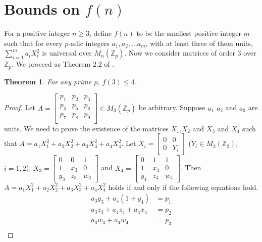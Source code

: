 \documentclass[12pt,a4paper]{article}
\newtheorem{thm}{Theorem}[section]
\begin{document}
	\section{Bounds on $f(n)$} \label{Sec bounds f(n)}
	For a positive integer $n \geq 3$, define $f(n)$ to be the smallest positive integer $m$ such that for every $p$-adic integers $a_1,a_2, \ldots a_m$, with at least three of them units,  $\sum_{i=1}^{m}a_iX_i^2$ is universal over $M_n(\mathbb{Z}_p)$.
	Now we consider matrices of order $3$ over $\mathbb{Z}_p$. We proceed as Theorem 2.2 of \cite{Koo2025}.
	\begin{thm} \label{thm f(3) for p=2}
		For any prime $p$, $f(3) \leq 4$.
	\end{thm} 
	\begin{proof}
		
			Let $A = \begin{bmatrix}
				p_1 & p_2 & p_3 \\
				p_4 & p_5 & p_6 \\
				p_7 & p_8 & p_9 \\
			\end{bmatrix} \in M_3(\mathbb{Z}_p)$ be arbitrary. Suppose $a_1$ $a_2$ and $a_3$ are units. We need to prove the existence of the matrices $X_1$,$X_2$ and $X_3$ and $X_4$  such that $A= a_1X_1^2 + a_2X_2^2 + a_3X_3^2 + a_4X_4^2$. Let $X_i = \begin{bmatrix}
				0 & 0 \\
				0 & Y_i
			\end{bmatrix}$ ($Y_i \in M_2(\mathbb{Z}_2)$, $i=1,2$), $X_3 = \begin{bmatrix}
				0 & 0 & 1 \\
				1 & x_3 & 0 \\
				y_3 & z_3 & w_3
			\end{bmatrix}$ and $X_4= \begin{bmatrix}
				0 & 1 & 1\\
				1 & x_4 & 0 \\
				y_4 & z_4 & w_4
			\end{bmatrix}$. Then $A= a_1X_1^2 + a_2X_2^2 + a_3X_3^2 + a_4X_4^2$ holds if and only if the following equations hold.
			\begin{subequations}
				\begin{align}
					a_3y_3 + a_4 (1+y_4) &= p_1  \label{eq 3a} \\ 
					a_3z_3 + a_4z_4 + a_4x_4 &= p_2 \label{eq 3b} \\
					a_3w_3 + a_4w_4 &= p_3 \label{eq 3c} \\

\end{align}
\end{subequations}
\end{proof}
\end{document}
